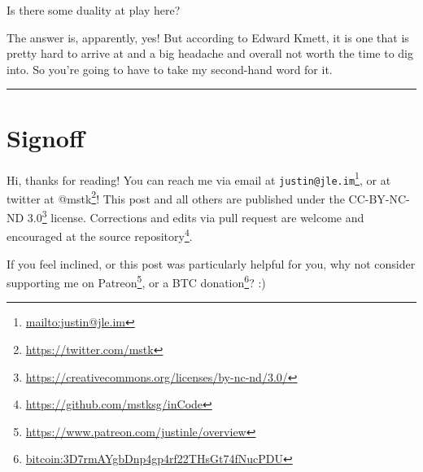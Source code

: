 \documentclass[]{article}
\renewcommand{\href}[2]{#2\footnote{\url{#1}}}
\begin{document}
Is there some duality at play here?

The answer is, apparently, yes! But according to Edward Kmett, it is one that is
pretty hard to arrive at and a big headache and overall not worth the time to
dig into. So you're going to have to take my second-hand word for it.

\begin{center}\rule{0.5\linewidth}{0.5pt}\end{center}

\section{Signoff}\label{signoff}

Hi, thanks for reading! You can reach me via email at
\href{mailto:justin@jle.im}{\nolinkurl{justin@jle.im}}, or at twitter at
\href{https://twitter.com/mstk}{@mstk}! This post and all others are published
under the \href{https://creativecommons.org/licenses/by-nc-nd/3.0/}{CC-BY-NC-ND
3.0} license. Corrections and edits via pull request are welcome and encouraged
at \href{https://github.com/mstksg/inCode}{the source repository}.

If you feel inclined, or this post was particularly helpful for you, why not
consider \href{https://www.patreon.com/justinle/overview}{supporting me on
Patreon}, or a \href{bitcoin:3D7rmAYgbDnp4gp4rf22THsGt74fNucPDU}{BTC donation}?
:)
\end{document}
